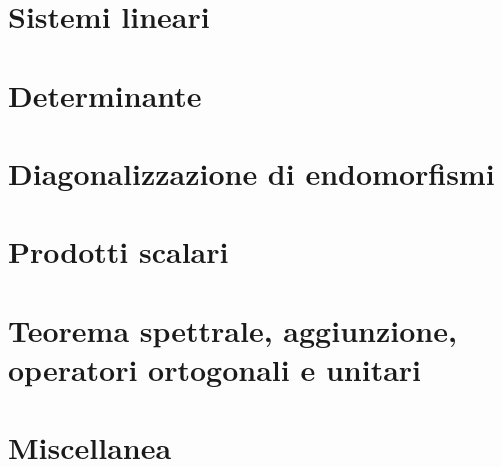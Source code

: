 \documentclass[9pt, a4paper]{article}
\theoremstyle{mythm}
\begin{document}
\clearpage

\section{Sistemi lineari}


\clearpage

\section{Determinante}


\clearpage

\section{Diagonalizzazione di endomorfismi}



\clearpage

\section{Prodotti scalari}



\clearpage

\section{Teorema spettrale, aggiunzione, operatori ortogonali e unitari}


\clearpage

\section{Miscellanea}

\end{document}
